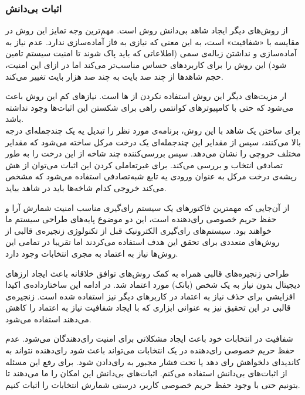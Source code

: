 \subsubsection{اثبات بی‌دانش }
از روش‌های دیگر ایجاد شاهد بی‌دانش روش 
\cite{zkstark}
است. مهم‌ترین وجه تمایز این روش در مقایسه با
 «شفافیت»
است، به این معنی که نیازی به فاز آماده‌سازی ندارد. عدم نیاز به آماده‌سازی و نداشتن زباله‌ی سمی (اطلاعاتی که باید پاک شوند تا امنیت سیستم تامین شود) این روش را برای کاربرد‌های حساس مناسب‌تر می‌کند اما در ازای این امنیت، حجم شاهد‌ها از چند صد بایت به چند صد هزار بایت تغییر می‌کند.
\par
ار مزیت‌های دیگر این روش استفاده نکردن از 
ها
است. نیاز‌های کم این روش باعث می‌شود که حتی با کامپیوتر‌های کوانتمی
 راهی برای شکستن این اثبات‌ها وجود نداشته باشد.
\\
برای ساختن یک شاهد با این روش، برنامه‌ی مورد نظر را تبدیل یه یک چندچمله‌ای درجه بالا می‌کنند، سپس از مقدایر این چندجمله‌ای یک درخت مرکل ساخته می‌شود که مقدایر مختلف خروچی را نشان می‌دهد. سپس بررسی‌کننده چند شاخه از این درخت را به طور تصادفی انتخاب و بررسی می‌کند. برای غیرتعاملی کردن این اثبات می‌توان از هش ریشه‌ی درخت مرکل به عنوان ورودی یه تابع شبه‌تصادفی
استفاده می‌شود که مشخص می‌کند خروجی کدام شاخه‌ها باید در شاهد بیاید. 






از آن‌جایی که مهمترین فاکتورهای یک سیستم رای‌گیری مناسب امنیت شمارش آرا و حفظ حریم خصوصی رای‌دهنده است، این دو موضوع پایه‌های طراحی سیستم ما خواهند بود. سیستم‌های رای‌گیری الکترونیک قبل از تکنولوژی زنجیره‌ی قالبی از روش‌های متعددی برای تحقق این هدف استفاده می‌کردند اما تقریبا در تمامی این روش‌ها نیاز به اعتماد به مجری انتخابات وجود دارد. 
\par
طراحی زنجیره‌های قالبی همراه به کمک روش‌های توافق خلاقانه باعث ایجاد ارز‌های دیجیتال بدون نیاز به یک شخص (بانک) مورد اعتماد شد. در ادامه این ساختارداده‌ی اکیدا افزایشی برای حذف نیاز به اعتماد در کاربرهای دیگر نیز استفاده شده است. زنجیره‌ی قالبی در این تحقیق نیز به عنوانی ابزاری که با ایجاد شفافیت نیاز به اعتماد را کاهش می‌دهند استفاده می‌شود.
\par 
شفافیت در انتخابات خود باعث ایجاد مشکلاتی برای امنیت رای‌دهندگان می‌شود. عدم حفظ حریم خصوصی رای‌دهنده در یک انتخابات می‌تواند باعث شود رای‌دهنده نتواند به کاندیدای دلخواهش رای دهد یا تحت فشار مجبور به رای‌دادن شود. برای رفع این مسئله از اثبات‌های بی‌دانش استفاده می‌کنم. اثبات‌های بی‌دانش این امکان را ما می‌دهند تا بتونیم حتی با وجود حفظ حریم خصوصی کاربر، درستی شمارش انتخابات را اثبات کنیم.


